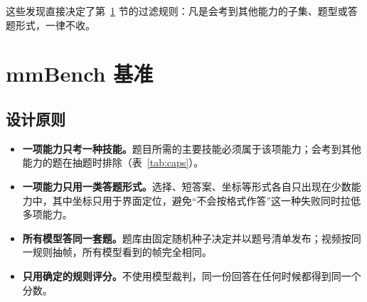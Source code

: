\documentclass[11pt,a4paper,fontset=none]{ctexart}
\newcommand{\lead}[1]{\textbf{#1}\quad}
\begin{document}
这些发现直接决定了第~\ref{sec:bench} 节的过滤规则：凡是会考到其他能力的子集、题型或答题形式，一律不收。

\section{mmBench 基准}
\label{sec:bench}

\subsection{设计原则}

\begin{itemize}[leftmargin=1.6em]
  \item \lead{一项能力只考一种技能。}题目所需的主要技能必须属于该项能力；会考到其他能力的题在抽题时排除（表~\ref{tab:caps}）。
  \item \lead{一项能力只用一类答题形式。}选择、短答案、坐标等形式各自只出现在少数能力中，其中坐标只用于界面定位，避免“不会按格式作答”这一种失败同时拉低多项能力。
  \item \lead{所有模型答同一套题。}题库由固定随机种子决定并以题号清单发布；视频按同一规则抽帧，所有模型看到的帧完全相同。
  \item \lead{只用确定的规则评分。}不使用模型裁判，同一份回答在任何时候都得到同一个分数。
\end{itemize}
\end{document}
